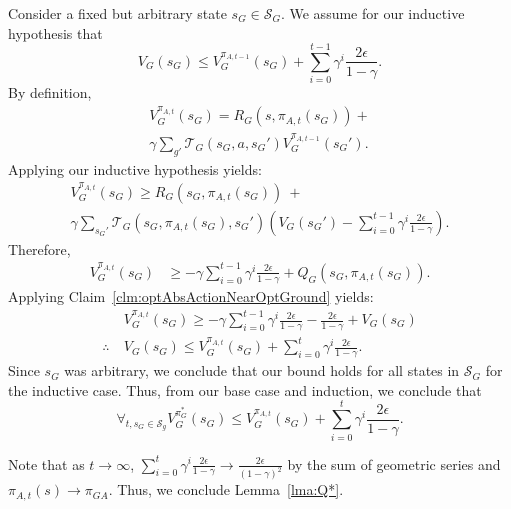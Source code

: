 Consider a fixed but arbitrary state $s_G \in \mathcal{S}_G$.
We assume for our inductive hypothesis that
\begin{equation}
V_G(s_G) \leq V_G^{\pi_{A,t-1}}(s_G) + \sum_{i=0}^{t-1}\gamma^i \frac{2\epsilon}{1-\gamma}.
\end{equation}
By definition,
\begin{multline*}
V_G^{\pi_{A,t}}(s_G) = R_G(s, \pi_{A,t}(s_G)) + \\ \gamma \sum_{g'}\mathcal{T}_G(s_G, a, {s_G}')V_G^{\pi_{A,t-1}}({s_G}').
\end{multline*}
Applying our inductive hypothesis yields:
\begin{multline*}
V_G^{\pi_{A,t}}(s_G) \geq R_G(s_G, \pi_{A,t}(s_G))\ + \\ \gamma \sum_{{s_G}'}\mathcal{T}_G(s_G, \pi_{A,t}(s_G), {s_G}')\left(V_G({s_G}') - \sum_{i=0}^{t-1}\gamma^i \frac{2\epsilon}{1-\gamma} \right).
\end{multline*}
Therefore,
\begin{align*}
V_G^{\pi_{A,t}}(s_G) &\geq -\gamma\sum_{i=0}^{t-1}\gamma^i \frac{2\epsilon}{1-\gamma} + Q_G(s_G, \pi_{A,t} (s_G)).
\end{align*}
Applying Claim~\ref{clm:optAbsActionNearOptGround} yields:
\begin{align*}
&V_G^{\pi_{A,t}}(s_G) \geq -\gamma\sum_{i=0}^{t-1}\gamma^i \frac{2\epsilon}{1-\gamma} - \frac{2\epsilon}{1-\gamma} + V_{G}(s_G) \\
\therefore\ &V_G(s_G) \leq V_G^{\pi_{A,t}}(s_G)  + \sum_{i=0}^{t}\gamma^i \frac{2\epsilon}{1-\gamma}.
\end{align*}
Since $s_G$ was arbitrary, we conclude that our bound holds for all states in $\mathcal{S}_G$ for the inductive case.
Thus, from our base case and induction, we conclude that
\begin{equation}
\forall_{t, s_G \in \mathcal{S}_g} V_G^{\pi_G^*}(s_G) \leq  V_G^{\pi_{A,t}}(s_G) + \sum_{i=0}^{t}\gamma^i \frac{2\epsilon}{1-\gamma}.
\end{equation}

Note that as $t \rightarrow \infty$, $\sum_{i=0}^{t}\gamma^i \frac{2\epsilon}{1-\gamma} \rightarrow \frac{2\epsilon}{(1-\gamma)^2}$ by the sum of geometric series and $\pi_{A,t}(s) \rightarrow \pi_{GA}$.
Thus, we conclude Lemma~\ref{lma:Q*}.

